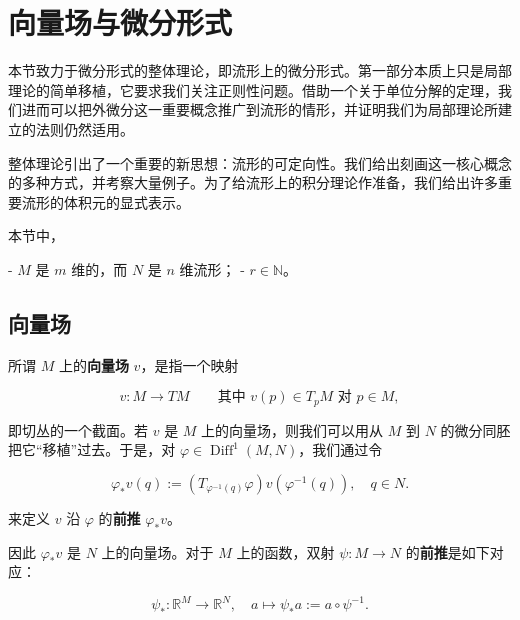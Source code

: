 \section{向量场与微分形式}

本节致力于微分形式的整体理论，即流形上的微分形式。第一部分本质上只是局部理论的简单移植，它要求我们关注正则性问题。借助一个关于单位分解的定理，我们进而可以把外微分这一重要概念推广到流形的情形，并证明我们为局部理论所建立的法则仍然适用。

整体理论引出了一个重要的新思想：流形的可定向性。我们给出刻画这一核心概念的多种方式，并考察大量例子。为了给流形上的积分理论作准备，我们给出许多重要流形的体积元的显式表示。

本节中，

- $ M $ 是 $ m $ 维的，而 $ N $ 是 $ n $ 维流形；
- $ r \in \mathbb{N} $。

\subsection*{向量场}

所谓 $ M $ 上的\textbf{向量场} $ v $，是指一个映射

\[
v : M \to TM \qquad \text{其中 } v(p) \in T_{p}M \text{ 对 } p \in M ,
\]

即切丛的一个截面。若 $ v $ 是 $ M $ 上的向量场，则我们可以用从 $ M $ 到 $ N $ 的微分同胚把它“移植”过去。于是，对 $ \varphi \in \operatorname{Diff}^{1}(M,N) $，我们通过令

\[
\varphi_{*}v(q) := (T_{\varphi^{-1}(q)}\varphi)v(\varphi^{-1}(q)) , \quad q \in N .
\]

来定义 $ v $ 沿 $ \varphi $ 的\textbf{前推} $ \varphi_{*}v $。


因此 $ \varphi_{*}v $ 是 $ N $ 上的向量场。对于 $ M $ 上的函数，双射 $ \psi : M \to N $ 的\textbf{前推}是如下对应：

\[
\psi_{*} : \mathbb{R}^{M} \to \mathbb{R}^{N} , \quad a \mapsto \psi_{*}a := a \circ \psi^{-1} .
\]

